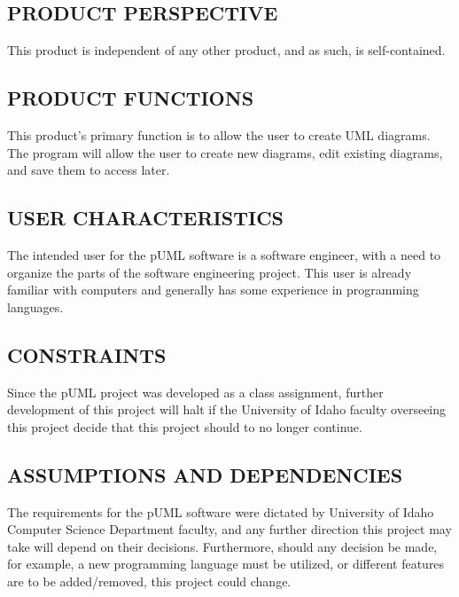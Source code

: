 \documentclass[twoside,letterpaper]{article}
\begin{document}
\subsection[PRODUCT PERSPECTIVE]{\rmfamily\bfseries\color{black}
PRODUCT PERSPECTIVE}
{\color{black}
This product is independent of any other product, and as such, is self-contained.
}

\subsection[PRODUCT FUNCTIONS]{\rmfamily\bfseries\color{black}
PRODUCT FUNCTIONS}
{\color{black}
This product's primary function is to allow the user to create UML diagrams.  
The program will allow the user to create new diagrams, edit existing diagrams, and save them to access later.
}

\subsection[USER CHARACTERISTICS]{\rmfamily\bfseries\color{black}
USER CHARACTERISTICS}
{\color{black}
The intended user for the pUML software is a software engineer, with a need to organize
the parts of the software engineering project. This user is already familiar with
computers and generally has some experience in programming languages.
}

\subsection[CONSTRAINTS]{\rmfamily\bfseries\color{black}
CONSTRAINTS}
{\color{black}
Since the pUML project was developed as a class assignment,
further development of this project will halt if the University of Idaho
faculty overseeing this project decide that this project should to no longer continue.
}

\subsection[ASSUMPTIONS AND DEPENDENCIES]{\rmfamily\bfseries\color{black}
ASSUMPTIONS AND DEPENDENCIES}
{\color{black}
The requirements for the pUML software were dictated by University of Idaho Computer Science
Department faculty, and any further direction this project may take will depend on their decisions.  
Furthermore, should any decision be made, for example,  a new programming language must be utilized,
or different features are to be added/removed, this project could change.
}
\end{document}
